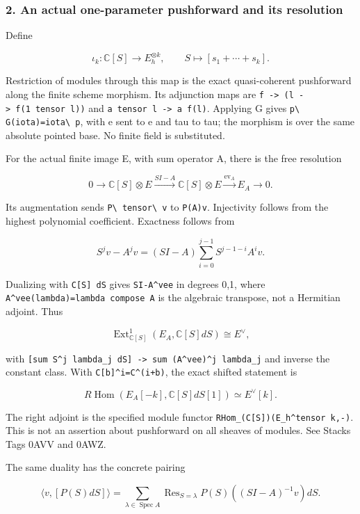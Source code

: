 \subsubsection{2. An actual one-parameter pushforward and its
resolution}\label{pr_17:an-actual-one-parameter-pushforward-and-its-resolution}

Define

\[\iota_k:\mathbb C[S]\to E_h^{\otimes k},\qquad S\mapsto[s_1+\cdots+s_k].\]

Restriction of modules through this map is the exact quasi-coherent pushforward along the finite
scheme morphism. Its adjunction maps are
\texttt{f\ -\textgreater{}\ (l\ -\textgreater{}\ f(1\ tensor\ l))} and
\texttt{a\ tensor\ l\ -\textgreater{}\ a\ f(l)}. Applying G gives \nolinkurl{p\ G(iota)=iota\ p}, with
e sent to e and tau to tau; the morphism is over the same absolute pointed base. No finite field is
substituted.

For the actual finite image E, with sum operator A, there is the free resolution

\[0\to\mathbb C[S]\otimes E\xrightarrow{SI-A}\mathbb C[S]\otimes E\xrightarrow{\mathrm{ev}_A}E_A\to0.\]

Its augmentation sends \nolinkurl{P\ tensor\ v} to \nolinkurl{P(A)v}. Injectivity follows from the highest
polynomial coefficient. Exactness follows from

\[S^jv-A^jv=(SI-A)\sum_{i=0}^{j-1}S^{j-1-i}A^iv.\]

Dualizing with \texttt{C{[}S{]}\ dS} gives \texttt{SI-A\^{}vee} in degrees 0,1, where
\texttt{A\^{}vee(lambda)=lambda\ compose\ A} is the algebraic transpose, not a Hermitian adjoint.
Thus

\[\operatorname{Ext}^1_{\mathbb C[S]}(E_A,\mathbb C[S]dS)\cong E^\vee,\]

with \texttt{{[}sum\ S\^{}j\ lambda\_j\ dS{]}\ -\textgreater{}\ sum\ (A\^{}vee)\^{}j\ lambda\_j} and
inverse the constant class. With \texttt{C{[}b{]}\^{}i=C\^{}(i+b)}, the exact shifted statement is

\[R\operatorname{Hom}(E_A[-k],\mathbb C[S]dS[1])\simeq E^\vee[k].\]

The right adjoint is the specified module functor \texttt{RHom\_(C{[}S{]})(E\_h\^{}tensor\ k,-)}.
This is not an assertion about pushforward on all sheaves of modules. See Stacks Tags 0AVV and 0AWZ.

The same duality has the concrete pairing

\[\langle v,[P(S)dS]\rangle=\sum_{\lambda\in\operatorname{Spec}A}\operatorname{Res}_{S=\lambda}P(S)((SI-A)^{-1}v)dS.\]


